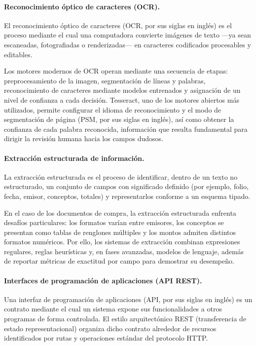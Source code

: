\paragraph{Reconocimiento óptico de caracteres (OCR).} El reconocimiento óptico de caracteres (OCR, por sus siglas en inglés) es el proceso mediante el cual una computadora convierte imágenes de texto —ya sean escaneadas, fotografiadas o renderizadas— en caracteres codificados procesables y editables\cite{tesseract_ocr}.

Los motores modernos de OCR operan mediante una secuencia de etapas: preprocesamiento de la imagen, segmentación de líneas y palabras, reconocimiento de caracteres mediante modelos entrenados y asignación de un nivel de confianza a cada decisión. Tesseract, uno de los motores abiertos más utilizados, permite configurar el idioma de reconocimiento y el modo de segmentación de página (PSM, por sus siglas en inglés), así como obtener la confianza de cada palabra reconocida, información que resulta fundamental para dirigir la revisión humana hacia los campos dudosos\cite{smith_tesseract_2007, tesseract_ocr}.

\paragraph{Extracción estructurada de información.} La extracción estructurada es el proceso de identificar, dentro de un texto no estructurado, un conjunto de campos con significado definido (por ejemplo, folio, fecha, emisor, conceptos, totales) y representarlos conforme a un esquema tipado\cite{structured_extraction_2023}.

En el caso de los documentos de compra, la extracción estructurada enfrenta desafíos particulares: los formatos varían entre emisores, los conceptos se presentan como tablas de renglones múltiples y los montos admiten distintos formatos numéricos. Por ello, los sistemas de extracción combinan expresiones regulares, reglas heurísticas y, en fases avanzadas, modelos de lenguaje, además de reportar métricas de exactitud por campo para demostrar su desempeño\cite{kim_donut_2022, structured_extraction_2023}.

\paragraph{Interfaces de programación de aplicaciones (API REST).} Una interfaz de programación de aplicaciones (API, por sus siglas en inglés) es un contrato mediante el cual un sistema expone sus funcionalidades a otros programas de forma controlada. El estilo arquitectónico REST (transferencia de estado representacional) organiza dicho contrato alrededor de recursos identificados por rutas y operaciones estándar del protocolo HTTP\cite{fielding_rest_2000}.

